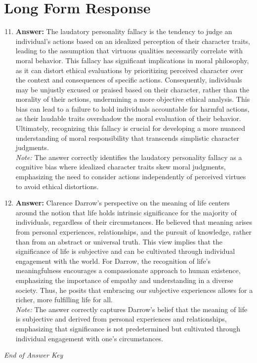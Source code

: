 \documentclass[12pt]{article}
\begin{document}
\section*{Long Form Response}
\begin{enumerate}[label=\arabic*.]
\setcounter{enumi}{10}
\item \textbf{Answer:} The laudatory personality fallacy is the tendency to judge an individual's actions based on an idealized perception of their character traits, leading to the assumption that virtuous qualities necessarily correlate with moral behavior. This fallacy has significant implications in moral philosophy, as it can distort ethical evaluations by prioritizing perceived character over the context and consequences of specific actions. Consequently, individuals may be unjustly excused or praised based on their character, rather than the morality of their actions, undermining a more objective ethical analysis. This bias can lead to a failure to hold individuals accountable for harmful actions, as their laudable traits overshadow the moral evaluation of their behavior. Ultimately, recognizing this fallacy is crucial for developing a more nuanced understanding of moral responsibility that transcends simplistic character judgments.
\\ \textit{Note:} The answer correctly identifies the laudatory personality fallacy as a cognitive bias where idealized character traits skew moral judgments, emphasizing the need to consider actions independently of perceived virtues to avoid ethical distortions.
\item \textbf{Answer:} Clarence Darrow's perspective on the meaning of life centers around the notion that life holds intrinsic significance for the majority of individuals, regardless of their circumstances. He believed that meaning arises from personal experiences, relationships, and the pursuit of knowledge, rather than from an abstract or universal truth. This view implies that the significance of life is subjective and can be cultivated through individual engagement with the world. For Darrow, the recognition of life's meaningfulness encourages a compassionate approach to human existence, emphasizing the importance of empathy and understanding in a diverse society. Thus, he posits that embracing our subjective experiences allows for a richer, more fulfilling life for all.
\\ \textit{Note:} The answer correctly captures Darrow's belief that the meaning of life is subjective and derived from personal experiences and relationships, emphasizing that significance is not predetermined but cultivated through individual engagement with one's circumstances.
\end{enumerate}

\vfill
\noindent\textit{End of Answer Key}
\end{document}
